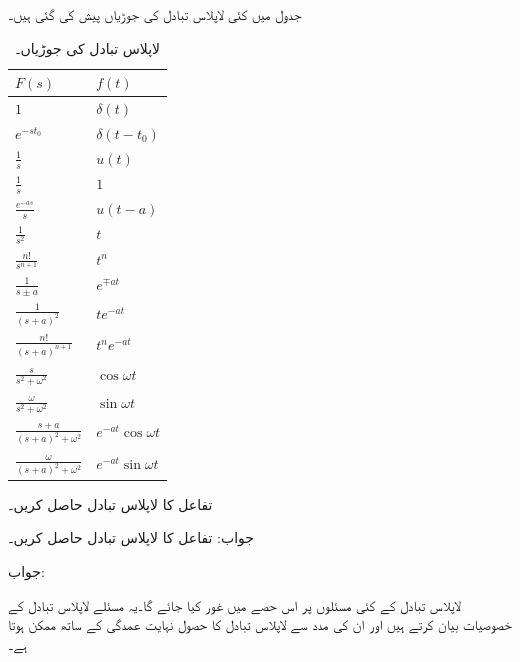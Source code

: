 جدول  میں کئی لاپلاس تبادل کی جوڑیاں پیش کی گئی ہیں۔
\begin{table}
\caption{لاپلاس تبادل کی جوڑیاں۔}
\label{جدول_لاپلاس_بدل_جوڑیاں}
\centering
\begin{tabular}{l l}
$F(s)$&$f(t)$\Bstrut \\
\hline 
$1$&$\delta(t)$ \Tstrut \\
$e^{-s t_0}$&$\delta(t-t_0)$ \\[2ex] 
$\frac{1}{s}$&$u(t)$ \\[2ex] 
$\frac{1}{s}$&$1$ \\[2ex] 
$\frac{e^{-as}}{s}$&$u(t-a)$ \\[2ex] 
$\frac{1}{s^2}$&$t$ \\[2ex] 
$\frac{n!}{s^{n+1}}$&$t^n$ \\[2ex] 
$\frac{1}{s\pm a}$&$e^{\mp at}$ \\[2ex] 
$\frac{1}{(s+a)^2}$&$te^{-at}$ \\[2ex] 
$\frac{n!}{(s+a)^{n+1}}$&$t^n e^{-at}$ \\[2ex] 
$\frac{s}{s^2+\omega^2}$&$\cos \omega t$ \\[2ex] 
$\frac{\omega}{s^2+\omega^2}$&$\sin \omega t$ \\[2ex] 
$\frac{s+a}{(s+a)^2+\omega^2}$&$e^{-at} \cos \omega t$ \\[2ex] 
$\frac{\omega}{(s+a)^2+\omega^2}$&$e^{-at} \sin \omega t$ 
\end{tabular}
\end{table}

تفاعل  کا لاپلاس تبادل حاصل کریں۔

جواب:
تفاعل  کا لاپلاس تبادل حاصل کریں۔

جواب:

لاپلاس تبادل کے کئی مسئلوں پر اس حصے میں غور کیا جائے گا۔یہ مسئلے لاپلاس تبادل کے خصوصیات بیان کرتے ہیں اور ان کی مدد سے لاپلاس تبادل کا حصول نہایت عمدگی کے ساتھ ممکن ہوتا ہے۔

